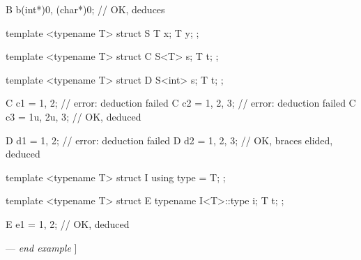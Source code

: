 \begin{adjustwidth}{0.5cm}{0.5cm}
\begin{codeblock}
B b{(int*)0, (char*)0};      // OK, deduces 
\end{codeblock}
\begin{addedblock}
\begin{codeblock}
template <typename T>
struct S {
    T x;
    T y; 
};

template <typename T>
struct C {
    S<T> s;
    T t; 
};

template <typename T>
struct D {
    S<int> s;
    T t; 
};

C c1 = {1, 2};         // error: deduction failed 
C c2 = {1, 2, 3};      // error: deduction failed 
C c3 = {{1u, 2u}, 3};  // OK,  deduced

D d1 = {1, 2};         // error: deduction failed
D d2 = {1, 2, 3};      // OK, braces elided,  deduced

template <typename T>
struct I {
    using type = T;
};

template <typename T>
struct E {
    typename I<T>::type i;
    T t; 
};

E e1 = {1, 2};          // OK,  deduced
\end{codeblock}
\end{addedblock}
---  \emph{end example} ]
\end{adjustwidth}


\renewcommand{\bibname}{References}



